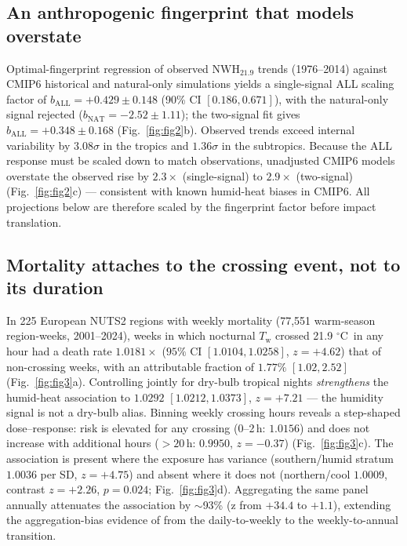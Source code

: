 \documentclass[12pt,a4paper]{article}
\newcommand{\dd}{\ensuremath{\,^{\circ}\mathrm{C}}}
\begin{document}
\subsection*{An anthropogenic fingerprint that models overstate}
Optimal-fingerprint regression of observed $\mathrm{NWH}_{21.9}$ trends (1976--2014) against CMIP6
historical and natural-only simulations yields a single-signal ALL scaling factor of
$b_\mathrm{ALL}=+0.429\pm0.148$ (90\% CI $[0.186,0.671]$), with the natural-only signal rejected
($b_\mathrm{NAT}=-2.52\pm1.11$); the two-signal fit gives $b_\mathrm{ALL}=+0.348\pm0.168$
(Fig.~\ref{fig:fig2}b). Observed trends exceed internal variability by $3.08\sigma$ in the tropics
and $1.36\sigma$ in the subtropics. Because the ALL response must be scaled down to match
observations, unadjusted CMIP6 models overstate the observed rise by $2.3\times$ (single-signal) to
$2.9\times$ (two-signal) (Fig.~\ref{fig:fig2}c) --- consistent with known humid-heat biases in
CMIP6\citep{Schwingshackl2021}. All projections below are therefore scaled by the fingerprint factor
before impact translation.

\subsection*{Mortality attaches to the crossing event, not to its duration}
In 225 European NUTS2 regions with weekly mortality (77,551 warm-season region-weeks, 2001--2024),
weeks in which nocturnal $T_\mathrm{w}$ crossed 21.9\,\dd~in any hour had a death rate
$1.0181\times$ ($95\%$ CI $[1.0104,1.0258]$, $z=+4.62$) that of non-crossing weeks, with an
attributable fraction of $1.77\%$ $[1.02,2.52]$ (Fig.~\ref{fig:fig3}a). Controlling jointly for
dry-bulb tropical nights \emph{strengthens} the humid-heat association to $1.0292$
$[1.0212,1.0373]$, $z=+7.21$ --- the humidity signal is not a dry-bulb alias. Binning weekly
crossing hours reveals a step-shaped dose--response: risk is elevated for any crossing
(0--2\,h: $1.0156$) and does not increase with additional hours ($>20$\,h: $0.9950$,
$z=-0.37$) (Fig.~\ref{fig:fig3}c). The association is present where the exposure has variance
(southern/humid stratum $1.0036$ per SD, $z=+4.75$) and absent where it does not (northern/cool
$1.0009$, contrast $z=+2.26$, $p=0.024$; Fig.~\ref{fig:fig3}d). Aggregating the same panel annually
attenuates the association by $\sim$93\% (z from $+34.4$ to $+1.1$), extending the aggregation-bias
evidence of \citet{Ballester2024} from the daily-to-weekly to the weekly-to-annual transition.
\end{document}
